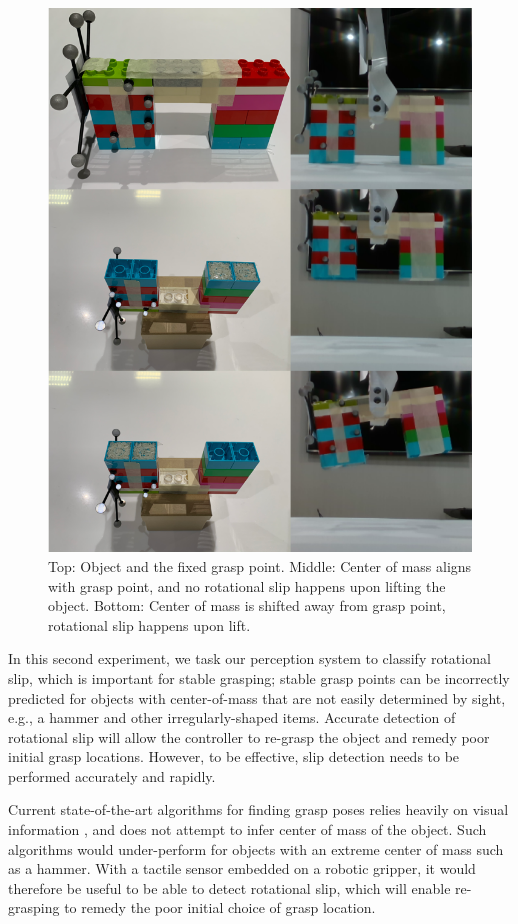 \documentclass[fyp]{socreport}
\begin{document}
\begin{figure}
\centering
\includegraphics[width=0.85\columnwidth]{images/robotsetup/slip_graf.png}
\caption{Top: Object and the fixed grasp point. Middle: Center of mass aligns with grasp point, and no rotational slip happens upon lifting the object. Bottom: Center of mass is shifted away from grasp point, rotational slip happens upon lift. }
\label{img:slips}
\end{figure}

In this second experiment, we task our perception system to classify rotational
slip, which is important for stable grasping; stable grasp points can be
incorrectly predicted for objects with center-of-mass that are not easily
determined by sight, e.g., a hammer and other irregularly-shaped items. Accurate
detection of rotational slip will allow the controller to re-grasp the object
and remedy poor initial grasp locations. However, to be effective, slip
detection needs to be performed accurately and rapidly.

Current state-of-the-art algorithms for finding grasp poses relies heavily on
visual information , and does not
attempt to infer center of mass of the object. Such algorithms would
under-perform for objects with an extreme center of mass such as a hammer.
With a tactile sensor embedded on a robotic gripper, it would therefore be
useful to be able to detect rotational slip, which will enable re-grasping to
remedy the poor initial choice of grasp location.
\end{document}
